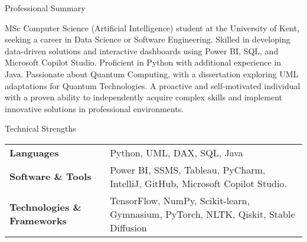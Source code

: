\documentclass[
	11pt, %
]{resume} %
\begin{document}

\begin{rSection}{Professional Summary}

    MSc Computer Science (Artificial Intelligence) student at the University of Kent, seeking a career in Data Science or Software Engineering. Skilled in developing data-driven solutions and interactive dashboards using Power BI, SQL, and Microsoft Copilot Studio. Proficient in Python with additional experience in Java. Passionate about Quantum Computing, with a dissertation exploring UML adaptations for Quantum Technologies. A proactive and self-motivated individual with a proven ability to independently acquire complex skills and implement innovative solutions in professional environments.

\end{rSection}



\begin{rSection}{Technical Strengths}

    \begin{tabular}{@{} p{3cm} p{12cm} @{}}
        \textbf{Languages} & Python, UML, DAX, SQL, Java \\ 
        \textbf{Software \& Tools} & Power BI, SSMS, Tableau, PyCharm, IntelliJ, GitHub, Microsoft Copilot Studio. \\
        \textbf{Technologies \& Frameworks} & TensorFlow, NumPy, Scikit-learn, Gymnasium, PyTorch, NLTK, Qiskit, Stable Diffusion \\
    \end{tabular}

\end{rSection}


\end{document}
